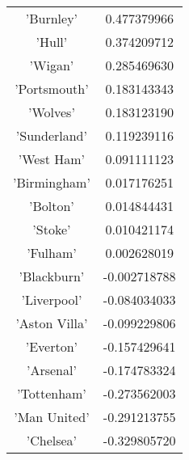 \documentclass[12pt]{article}
\begin{document}
\begin{tabular}{|c|c|}
\hline
'Burnley'     & 0.477379966\\
'Hull'        & 0.374209712\\
'Wigan'       & 0.285469630\\
'Portsmouth'  & 0.183143343\\
'Wolves'      & 0.183123190\\
'Sunderland'  & 0.119239116\\
'West Ham'    & 0.091111123\\
'Birmingham'  & 0.017176251\\
'Bolton'      & 0.014844431\\
'Stoke'       & 0.010421174\\
'Fulham'      & 0.002628019\\
'Blackburn'   &-0.002718788\\
'Liverpool'   &-0.084034033\\
'Aston Villa' &-0.099229806\\
'Everton'     &-0.157429641\\
'Arsenal'     &-0.174783324\\
'Tottenham'   &-0.273562003\\
'Man United'  &-0.291213755\\
'Chelsea'     &-0.329805720\\
\hline
\end{tabular}
\end{document}
